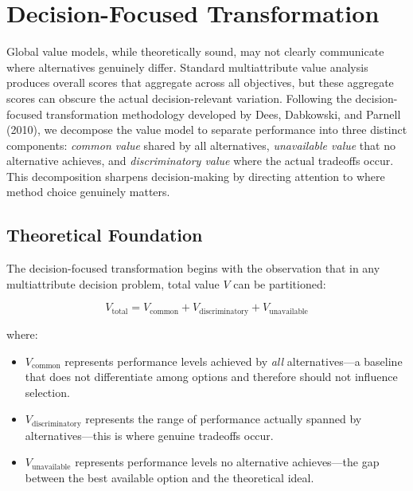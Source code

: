 \documentclass[12pt,a4paper]{article}
\begin{document}
\section{Decision-Focused Transformation}

Global value models, while theoretically sound, may not clearly communicate where alternatives genuinely differ. Standard multiattribute value analysis produces overall scores that aggregate across all objectives, but these aggregate scores can obscure the actual decision-relevant variation. Following the decision-focused transformation methodology developed by Dees, Dabkowski, and Parnell (2010), we decompose the value model to separate performance into three distinct components: \textit{common value} shared by all alternatives, \textit{unavailable value} that no alternative achieves, and \textit{discriminatory value} where the actual tradeoffs occur. This decomposition sharpens decision-making by directing attention to where method choice genuinely matters.

\subsection{Theoretical Foundation}

The decision-focused transformation begins with the observation that in any multiattribute decision problem, total value $V$ can be partitioned:

\begin{equation}
V_{\text{total}} = V_{\text{common}} + V_{\text{discriminatory}} + V_{\text{unavailable}}
\end{equation}

\noindent where:
\begin{itemize}
    \item $V_{\text{common}}$ represents performance levels achieved by \textit{all} alternatives---a baseline that does not differentiate among options and therefore should not influence selection.
    \item $V_{\text{discriminatory}}$ represents the range of performance actually spanned by alternatives---this is where genuine tradeoffs occur.
    \item $V_{\text{unavailable}}$ represents performance levels no alternative achieves---the gap between the best available option and the theoretical ideal.
\end{itemize}
\end{document}
